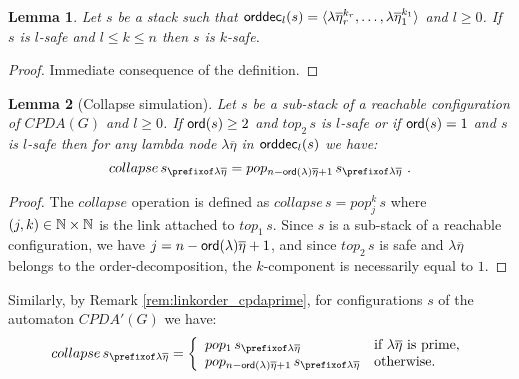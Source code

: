 \documentclass[a4paper,draft]{article}
\newtheorem{lemma}{Lemma}[section]
\theoremstyle{remark}
\theoremstyle{definition}
\newcommand\orddec{{\sf orddec}}
\begin{document}
\begin{lemma}
\label{lem:stacksafety_immediate results}
Let $s$ be a stack such that $\orddec_l(s) = \langle \lambda \overline\eta_r^{k_r}, \ldots, \lambda \overline{\eta}_1^{k_1} \rangle$ and $l\geq 0$.
If $s$ is $l$-safe and $l \leq k \leq n$ then $s$ is $k$-safe.
\end{lemma}
\begin{proof}
Immediate consequence of the definition.
\end{proof}

\begin{lemma}[Collapse simulation]
\label{lem:safecollapsesimulation}
Let $s$ be a sub-stack of a reachable configuration of $CPDA(G)$ and $l\geq 0$.
If ${\sf ord}(s) \geq 2$ and $top_2\,s$ is $l$-safe or if ${\sf ord}(s) = 1$ and $s$ is $l$-safe then for any lambda node $\lambda\overline\eta$ in $\orddec_l(s)$ we have:
$$collapse\,s_{\prefixof\lambda\overline\eta} = pop_{n-\ord \lambda\overline\eta +1}\,s_{\prefixof\lambda\overline\eta} \ . $$
\end{lemma}
\begin{proof}
The $collapse$ operation is defined as  $collapse\,s = pop_j^k\,s$ where $(j,k)\in\mathbb{N}\times\mathbb{N}$ is the link attached to $top_1\,s$.
Since $s$ is a sub-stack of a reachable configuration, we have $j = n-{\sf ord}(\lambda)\overline\eta +1$, and since
$top_2\,s$ is safe and $\lambda\overline\eta$ belongs to the order-decomposition, the $k$-component is necessarily equal to $1$.
\end{proof}
Similarly, by Remark \ref{rem:linkorder_cpdaprime}, for configurations $s$ of the automaton $CPDA'(G)$ we have:
$$collapse\,s_{\prefixof\lambda\overline\eta} = 
\left\{
\begin{array}{ll}
pop_1\,s_{\prefixof\lambda\overline\eta} & \mbox{if $\lambda\overline\eta$ is prime,}\\
pop_{n-\ord \lambda\overline\eta +1}\,s_{\prefixof\lambda\overline\eta} & \mbox{otherwise.}
\end{array}
\right.
$$
\end{document}
